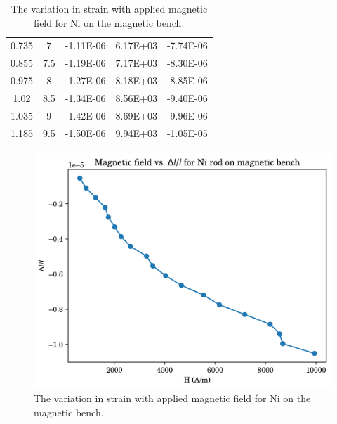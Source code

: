 \begin{table}[h!]
{\begin{tabular}{@{}ccccc@{}}
			0.735 & 7   & -1.11E-06 & 6.17E+03 & -7.74E-06 \\
			0.855 & 7.5 & -1.19E-06 & 7.17E+03 & -8.30E-06 \\
			0.975 & 8   & -1.27E-06 & 8.18E+03 & -8.85E-06 \\
			1.02  & 8.5 & -1.34E-06 & 8.56E+03 & -9.40E-06 \\
			1.035 & 9   & -1.42E-06 & 8.69E+03 & -9.96E-06 \\
			1.185 & 9.5 & -1.50E-06 & 9.94E+03 & -1.05E-05 \\ \bottomrule
		\end{tabular}%
	}
	\caption{The variation in strain with applied magnetic field for Ni on the magnetic bench.}
	\label{tab:my-table}
\end{table}
\begin{figure}
	\centering
	\includegraphics{data/mb-Ni-1}
	\caption{The variation in strain with applied magnetic field for Ni on the magnetic bench.}
	\label{fig:mb-ni-1}
\end{figure}

